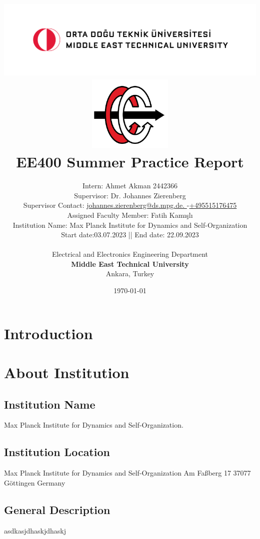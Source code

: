 \documentclass[letterpaper,12pt]{article}
\title{
\includegraphics[width=17cm]{odtu.png} \\
\includegraphics[width=4cm]{eee.png} \\
\vspace*{0.5in}
\textbf{EE400 Summer Practice Report}
\vspace*{0.25in}
}
\author{Intern: Ahmet Akman 2442366\\
Supervisor: Dr. Johannes Zierenberg\\
Supervisor Contact: \href{mailto: johannes.zierenberg@ds.mpg.de}{ johannes.zierenberg@ds.mpg.de. }-\href{tel:+495515176475}{+495515176475}\\
Assigned Faculty Member: Fatih Kamışlı\\
Institution Name: Max Planck Institute for Dynamics and Self-Organization\\
Start date:03.07.2023 || End date: 22.09.2023\\
        \vspace*{0.25in} \\
        Electrical and Electronics Engineering Department\\
        \textbf{Middle East Technical University}\\
        Ankara, Turkey
       } \date{\today}
\begin{document}


%


\maketitle

\newpage
\tableofcontents
\newpage
\section{Introduction}
\section{About Institution}
\subsection{Institution Name}
Max Planck Institute for Dynamics and Self-Organization.
\subsection{Institution Location}
Max Planck Institute for Dynamics and Self-Organization
Am Faßberg 17
37077 Göttingen
Germany
\subsection{General Description}
asdkasjdhaskjdhaskj
\end{document}
